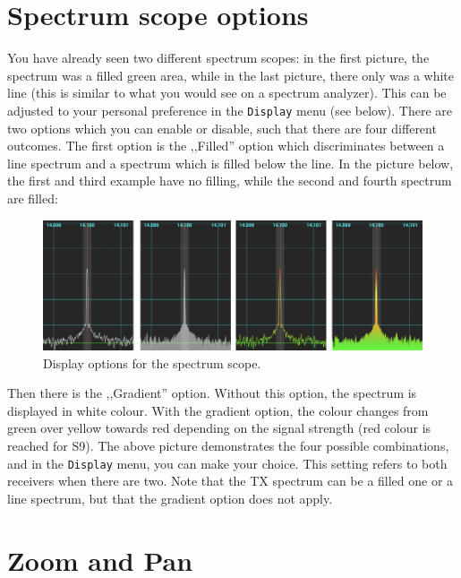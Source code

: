 \documentclass[12pt]{book}
\def\bltt#1{\texttt{\color{blue}#1}}
\begin{document}
\section{Spectrum scope options}
\label{sec:FillingGradient}

You have already seen two different spectrum scopes: in the first
picture, the  spectrum was a filled green area, while in the last
picture, there only was a white line (this is similar to what you
would see on a spectrum analyzer). This can be adjusted to your
personal preference in the \bltt{Display} menu (see below). There
are two options which you can enable or disable, such that there
are four different outcomes. The first option is the ,,Filled'' option
which discriminates between a line spectrum and a spectrum which is
filled below the line. In the picture below, the first and third
example have no filling, while the second and fourth spectrum
are filled:

\begin{figure}[ht]
\center
\includegraphics[width=12cm]{ScopeFilling.png}
\caption{Display options for the spectrum scope.}
\end{figure}

Then there is the ,,Gradient'' option. Without this option, the
spectrum is displayed in white colour. With the gradient option,
the colour changes from green over yellow towards red depending
on the signal strength (red colour is reached for S9). The above
picture demonstrates the four possible combinations, and in
the \bltt{Display} menu, you can make your choice. This setting
refers to both receivers when there are two. Note that the TX
spectrum can be a filled one or a line spectrum, but that the
gradient option does not apply.

\section{Zoom and Pan}
\end{document}
